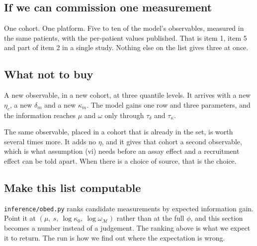 \documentclass[11pt]{article}
\newcommand{\Mset}{\mathcal{M}}
\begin{document}
\subsection{If we can commission one measurement}

One cohort. One platform. Five to ten of the model's observables, measured in the
same patients, with the per-patient values published. That is item 1, item 5 and
part of item 2 in a single study. Nothing else on the list gives three at once.

\subsection{What not to buy}

A new observable, in a new cohort, at three quantile levels. It arrives with a
new $\eta_c$, a new $\delta_m$ and a new $\kappa_m$. The model gains one row and
three parameters, and the information reaches $\mu$ and $\omega$ only through
$\tau_\delta$ and $\tau_\kappa$.

The same observable, placed in a cohort that is already in the set, is worth
several times more. It adds no $\eta$, and it gives that cohort a second
observable, which is what assumption (vi) needs before an assay effect and a
recruitment effect can be told apart. When there is a choice of source, that is
the choice.

\subsection{Make this list computable}

\texttt{inference/obed.py} ranks candidate measurements by expected information
gain. Point it at $(\mu,\ s,\ \log\kappa_0,\ \log\omega_\Mset)$ rather than at
the full $\phi$, and this section becomes a number instead of a judgement. The
ranking above is what we expect it to return. The run is how we find out where
the expectation is wrong.
\end{document}
